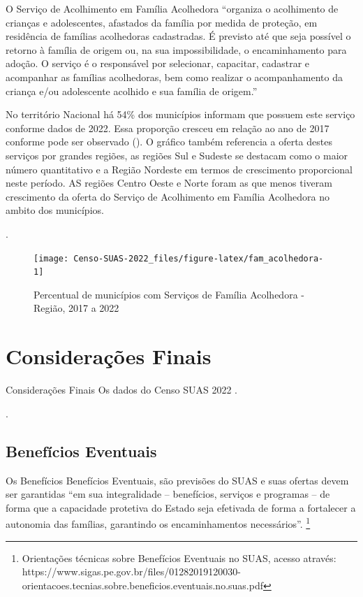 \documentclass[
  brazilian]{report}
\begin{document}
O Serviço de Acolhimento em Família Acolhedora ``organiza o acolhimento
de crianças e adolescentes, afastados da família por medida de proteção,
em residência de famílias acolhedoras cadastradas. É previsto até que
seja possível o retorno à família de origem ou, na sua impossibilidade,
o encaminhamento para adoção. O serviço é o responsável por selecionar,
capacitar, cadastrar e acompanhar as famílias acolhedoras, bem como
realizar o acompanhamento da criança e/ou adolescente acolhido e sua
família de origem.''

No território Nacional há 54\% dos municípios informam que possuem este
serviço conforme dados de 2022. Essa proporção cresceu em relação ao ano
de 2017 conforme pode ser observado (). O
gráfico também referencia a oferta destes serviços por grandes regiões,
as regiões Sul e Sudeste se destacam como o maior número quantitativo e
a Região Nordeste em termos de crescimento proporcional neste período.
AS regiões Centro Oeste e Norte foram as que menos tiveram crescimento
da oferta do Serviço de Acolhimento em Família Acolhedora no ambito dos
municípios.

.

\begin{figure}
\texttt{[image: Censo-SUAS-2022\_files/figure-latex/fam\_acolhedora-1]} \caption[Percentual de municípios com Serviços de Família Acolhedora - Região, 2017 a 2022]{Percentual de municípios com Serviços de Família Acolhedora - Região, 2017 a 2022}\label{fig:fam_acolhedora}
\end{figure}

\hypertarget{considerauxe7uxf5es-finais}{%
\chapter{Considerações Finais}\label{considerauxe7uxf5es-finais}}

Considerações Finais Os dados do Censo SUAS 2022 .

.

\hypertarget{benefuxedcios-eventuais}{%
\section{Benefícios Eventuais}\label{benefuxedcios-eventuais}}

Os Benefícios Benefícios Eventuais, são previsões do SUAS e suas ofertas
devem ser garantidas ``em sua integralidade -- benefícios, serviços e
programas -- de forma que a capacidade protetiva do Estado seja
efetivada de forma a fortalecer a autonomia das famílias, garantindo os
encaminhamentos necessários''.
\footnote{Orientações técnicas sobre Benefícios Eventuais no
SUAS, acesso através: https://www.sigas.pe.gov.br/files/01282019120030-orientacoes.tecnias.sobre.beneficios.eventuais.no.suas.pdf}
\end{document}
